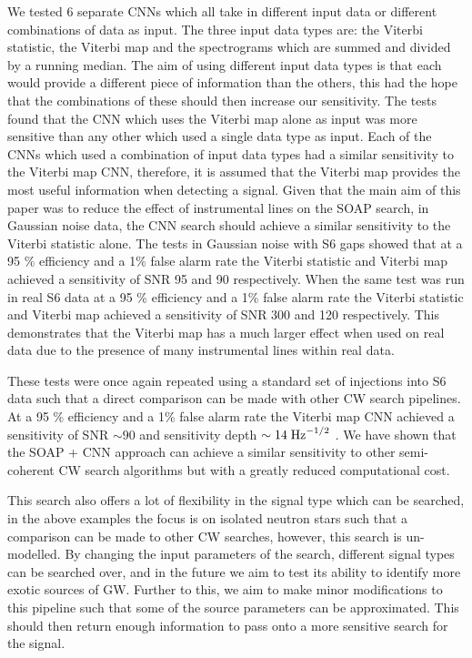We tested 6 separate \glspl{CNN} which all take in different input data or different combinations of data as input. 
The three input data types are: the Viterbi statistic, the Viterbi map and the spectrograms which are summed and divided by a running median.
The aim of using different input data types is that each would provide a different piece of information than the others, this had the hope that the combinations of these should then increase our sensitivity. 
The tests found that the \gls{CNN} which uses the Viterbi map alone as input was more sensitive than any other which used a single data type as input. 
Each of the \glspl{CNN} which used a combination of input data types had a similar sensitivity to the Viterbi map \gls{CNN}, therefore, it is assumed that the Viterbi map provides the most useful information when detecting a signal. 
Given that the main aim of this paper was to reduce the effect of instrumental lines on the SOAP search, in Gaussian noise data, the \gls{CNN} search should achieve a similar sensitivity to the Viterbi statistic alone. 
The tests in Gaussian noise with S6 gaps showed that at a 95 \% efficiency and a 1\% false alarm rate the Viterbi statistic and Viterbi map achieved a sensitivity of SNR 95 and 90 respectively. 
When the same test was run in real S6 data at a 95 \% efficiency and a 1\% false alarm rate the Viterbi statistic and Viterbi map achieved a sensitivity of SNR 300 and 120 respectively.
This demonstrates that the Viterbi map has a much larger effect when used on real data due to the presence of many instrumental lines within real data. 

These tests were once again repeated using a standard set of injections into S6 data such that a direct comparison can be made with other \gls{CW} search pipelines. 
At a 95 \% efficiency and a 1\% false alarm rate the Viterbi map \gls{CNN} achieved a sensitivity of \gls{SNR} $ \sim 90$ and sensitivity depth $\sim 14 \; \rm{Hz}^{-1/2}$ .
We have shown that the SOAP + \gls{CNN} approach can achieve a similar sensitivity to other semi-coherent \gls{CW} search algorithms but with a greatly reduced computational cost.

This search also offers a lot of flexibility in the signal type which can be searched, in the above examples the focus is on isolated neutron stars such that a comparison can be made to other \gls{CW} searches, however, this search is un-modelled. By changing the input parameters of the search, different signal types can be searched over, and in the future we aim to test its ability to identify more exotic sources of \gls{GW}. 
Further to this, we aim to make minor modifications to this pipeline such that some of the source parameters can be approximated. This should then return enough information to pass onto a more sensitive search for the signal. 


